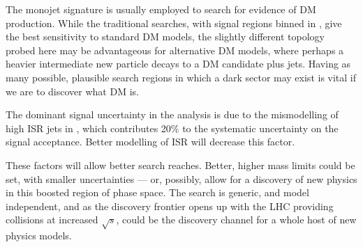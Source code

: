 The monojet signature is usually employed to search for evidence of \ac{DM} production. While the traditional searches, with signal regions binned in \MET, give the best sensitivity to standard \ac{DM} models, the slightly 
different topology probed here may be advantageous for alternative \ac{DM} 
models, where perhaps a heavier intermediate new particle decays to a 
\ac{DM} candidate plus jets. 
Having as many possible, plausible search regions in which a dark sector may exist is vital if we are to discover what \ac{DM} is.


The dominant signal uncertainty in the analysis is due to the mismodelling of high \pt \ac{ISR} jets in \MADGRAPH, which contributes 20\% to the systematic uncertainty on the signal acceptance. 
Better modelling of \ac{ISR} will decrease this factor.

These factors will allow better search reaches. Better, higher mass limits could be set, with smaller uncertainties --- or, possibly, allow for a discovery of new physics in this boosted region of phase space. The search is generic, and model independent, and as the discovery frontier opens up with the \ac{LHC} providing collisions at increased $\sqrt{s}$, could be the discovery channel for a whole host of new physics models.


